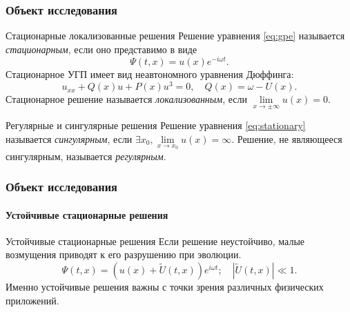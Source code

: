 \documentclass [10pt] {beamer}
\begin{document}
\begin{frame}
	\frametitle{Объект исследования}

	\begin{block}{Стационарные локализованные решения\footnotemark}
	 	Решение уравнения \eqref{eq:gpe} называется {\it \color{ceruleanblue} стационарным}, если оно представимо в виде
	 	\begin{equation}
			\Psi(t, x) = u(x) e^{-i \omega t}.	 		
	 	\end{equation}
		Стационарное УГП имеет вид неавтономного уравнения Дюффинга:
		\begin{equation}
			u_{xx} + Q(x) u + P(x) u^3 = 0, \quad Q(x) = \omega - U(x).
			\label{eq:stationary}
		\end{equation}
		Стационарное решение называется {\it \color{ceruleanblue} локализованным}, если $\lim \limits_{x \to \pm \infty} u(x) = 0$.
	\end{block}

	\begin{block}{Регулярные и сингулярные решения}
		Решение уравнения \eqref{eq:stationary} называется {\it \color{ceruleanblue} сингулярным}, если $\exists x_0, \lim \limits_{x \to x_0} u(x) = \infty$.
		Решение, не являющееся сингулярным, называется {\it \color{ceruleanblue} регулярным}.
	\end{block}
	
\end{frame}

\begin{frame}
	\frametitle{Объект исследования}
	\framesubtitle{Устойчивые стационарные решения}
	
	\begin{block}{Устойчивые стационарные решения}
		Если решение неустойчиво, малые возмущения приводят к его разрушению при эволюции.
		\begin{equation}
			\Psi(t, x) = \left( u(x) + \widetilde{U}(t, x) \right) e^{i \omega t}; \quad |\widetilde{U}(t, x)| \ll 1.
		\end{equation}
		Именно устойчивые решения важны с точки зрения различных физических приложений.
	\end{block}
\end{frame}
\end{document}
